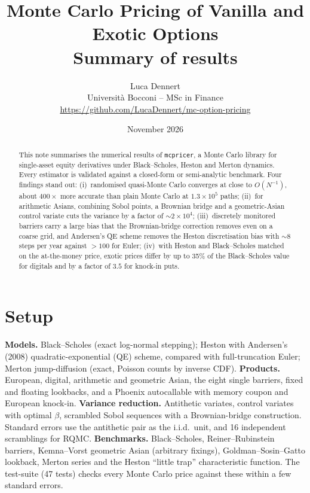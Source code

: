 \documentclass[11pt,a4paper]{article}
\title{\vspace{-1.2cm}\textbf{Monte Carlo Pricing of Vanilla and Exotic Options}\\[0.2em]
\large Summary of results}
\author{Luca Dennert\\\small Università Bocconi -- MSc in Finance\\
\small\url{https://github.com/LucaDennert/mc-option-pricing}}
\date{November 2026}
\begin{document}
\maketitle
\vspace{-0.6cm}

\begin{abstract}
\noindent This note summarises the numerical results of \texttt{mcpricer}, a Monte Carlo library
for single-asset equity derivatives under Black--Scholes, Heston and Merton dynamics. Every
estimator is validated against a closed-form or semi-analytic benchmark. Four findings stand out:
(i)~randomised quasi-Monte Carlo converges at close to $O(N^{-1})$, about $400\times$ more accurate
than plain Monte Carlo at $1.3\times10^5$ paths; (ii)~for arithmetic Asians, combining Sobol
points, a Brownian bridge and a geometric-Asian control variate cuts the variance by a factor of
$\sim\!2\times10^4$; (iii)~discretely monitored barriers carry a large bias that the Brownian-bridge
correction removes even on a coarse grid, and Andersen's QE scheme removes the Heston
discretisation bias with $\sim\!8$ steps per year against $>100$ for Euler; (iv)~with Heston and
Black--Scholes matched on the at-the-money price, exotic prices differ by up to 35\% of the
Black--Scholes value for digitals and by a factor of $3.5$ for knock-in puts.
\end{abstract}

\section{Setup}
\textbf{Models.} Black--Scholes (exact log-normal stepping); Heston with Andersen's (2008)
quadratic-exponential (QE) scheme, compared with full-truncation Euler; Merton jump-diffusion
(exact, Poisson counts by inverse CDF). \textbf{Products.} European, digital, arithmetic and
geometric Asian, the eight single barriers, fixed and floating lookbacks, and a Phoenix
autocallable with memory coupon and European knock-in. \textbf{Variance reduction.} Antithetic
variates, control variates with optimal $\beta$, scrambled Sobol sequences with a Brownian-bridge
construction. Standard errors use the antithetic pair as the i.i.d.\ unit, and 16 independent
scramblings for RQMC. \textbf{Benchmarks.} Black--Scholes, Reiner--Rubinstein barriers,
Kemna--Vorst geometric Asian (arbitrary fixings), Goldman--Sosin--Gatto lookback, Merton series
and the Heston ``little trap'' characteristic function. The test-suite (47 tests) checks every
Monte Carlo price against these within a few standard errors.
\end{document}
